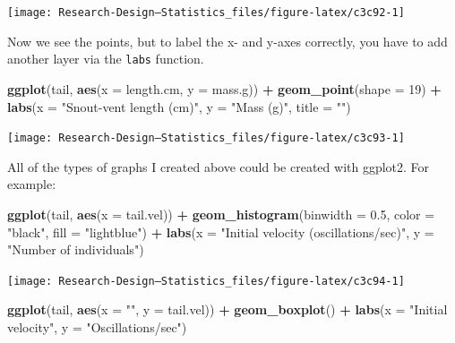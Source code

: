 \documentclass[
]{book}
\newenvironment{Shaded}{\begin{snugshade}}{\end{snugshade}}
\newcommand{\AttributeTok}[1]{\textcolor[rgb]{0.13,0.29,0.53}{#1}}
\newcommand{\DecValTok}[1]{\textcolor[rgb]{0.00,0.00,0.81}{#1}}
\newcommand{\FloatTok}[1]{\textcolor[rgb]{0.00,0.00,0.81}{#1}}
\newcommand{\FunctionTok}[1]{\textcolor[rgb]{0.13,0.29,0.53}{\textbf{#1}}}
\newcommand{\NormalTok}[1]{#1}
\newcommand{\SpecialCharTok}[1]{\textcolor[rgb]{0.81,0.36,0.00}{\textbf{#1}}}
\newcommand{\StringTok}[1]{\textcolor[rgb]{0.31,0.60,0.02}{#1}}
\begin{document}
\begin{center}\texttt{[image: Research-Design---Statistics\_files/figure-latex/c3c92-1]} \end{center}

Now we see the points, but to label the x- and y-axes correctly, you have to add another layer via the \texttt{labs} function.

\begin{Shaded}
\begin{Highlighting}[]
\FunctionTok{ggplot}\NormalTok{(tail, }\FunctionTok{aes}\NormalTok{(}\AttributeTok{x =}\NormalTok{ length.cm, }\AttributeTok{y =}\NormalTok{ mass.g)) }\SpecialCharTok{+}
  \FunctionTok{geom\_point}\NormalTok{(}\AttributeTok{shape =} \DecValTok{19}\NormalTok{) }\SpecialCharTok{+}
  \FunctionTok{labs}\NormalTok{(}\AttributeTok{x =} \StringTok{"Snout{-}vent length (cm)"}\NormalTok{, }\AttributeTok{y =} \StringTok{"Mass (g)"}\NormalTok{, }\AttributeTok{title =} \StringTok{""}\NormalTok{)}
\end{Highlighting}
\end{Shaded}

\begin{center}\texttt{[image: Research-Design---Statistics\_files/figure-latex/c3c93-1]} \end{center}

All of the types of graphs I created above could be created with ggplot2. For example:

\begin{Shaded}
\begin{Highlighting}[]
\FunctionTok{ggplot}\NormalTok{(tail, }\FunctionTok{aes}\NormalTok{(}\AttributeTok{x =}\NormalTok{ tail.vel)) }\SpecialCharTok{+}
  \FunctionTok{geom\_histogram}\NormalTok{(}\AttributeTok{binwidth =} \FloatTok{0.5}\NormalTok{, }\AttributeTok{color =} \StringTok{"black"}\NormalTok{, }\AttributeTok{fill =} \StringTok{"lightblue"}\NormalTok{) }\SpecialCharTok{+} 
  \FunctionTok{labs}\NormalTok{(}\AttributeTok{x =} \StringTok{"Initial velocity (oscillations/sec)"}\NormalTok{, }\AttributeTok{y =} \StringTok{"Number of individuals"}\NormalTok{)}
\end{Highlighting}
\end{Shaded}

\begin{center}\texttt{[image: Research-Design---Statistics\_files/figure-latex/c3c94-1]} \end{center}

\begin{Shaded}
\begin{Highlighting}[]
\FunctionTok{ggplot}\NormalTok{(tail, }\FunctionTok{aes}\NormalTok{(}\AttributeTok{x =} \StringTok{""}\NormalTok{, }\AttributeTok{y =}\NormalTok{ tail.vel)) }\SpecialCharTok{+}
  \FunctionTok{geom\_boxplot}\NormalTok{() }\SpecialCharTok{+}
  \FunctionTok{labs}\NormalTok{(}\AttributeTok{x =} \StringTok{"Initial velocity"}\NormalTok{, }\AttributeTok{y =} \StringTok{"Oscillations/sec"}\NormalTok{)}
\end{Highlighting}
\end{Shaded}
\end{document}
